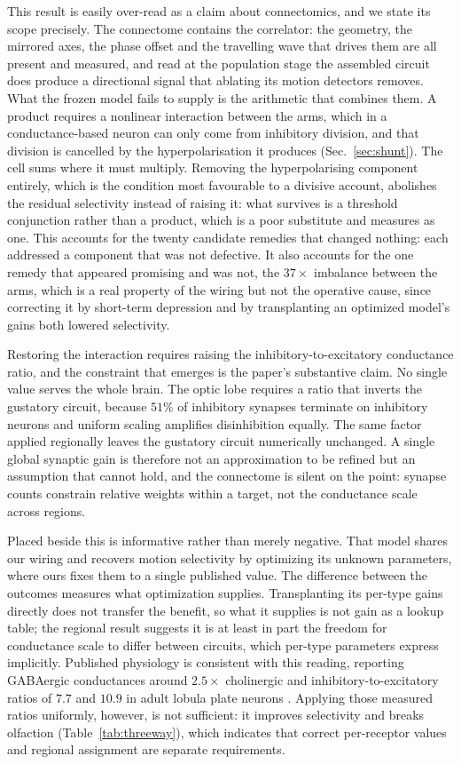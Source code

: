 \documentclass[10pt,twoside]{article}
\begin{document}
This result is easily over-read as a claim about connectomics, and we state its
scope precisely. The connectome contains the correlator: the geometry, the
mirrored axes, the phase offset and the travelling wave that drives them are
all present and measured, and read at the population stage the assembled
circuit does produce a directional signal that ablating its motion detectors
removes. What the frozen model fails to supply is the arithmetic
that combines them. A product requires a nonlinear interaction between the arms,
which in a conductance-based neuron can only come from inhibitory division, and
that division is cancelled by the hyperpolarisation it produces
(Sec.~\ref{sec:shunt}). The cell sums where it must multiply. Removing the
hyperpolarising component entirely, which is the condition most favourable to
a divisive account, abolishes the residual selectivity instead of raising it:
what survives is a threshold conjunction rather than a product, which is a
poor substitute and measures as one. This accounts for
the twenty candidate remedies that changed nothing: each addressed a component
that was not defective. It also accounts for the one remedy that appeared
promising and was not, the $37\times$ imbalance between the arms, which is a
real property of the wiring but not the operative cause, since correcting it by
short-term depression and by transplanting an optimized model's gains both
lowered selectivity.

Restoring the interaction requires raising the inhibitory-to-excitatory
conductance ratio, and the constraint that emerges is the paper's substantive
claim. No single value serves the whole brain. The optic lobe requires a ratio
that inverts the gustatory circuit, because $51\%$ of inhibitory synapses
terminate on inhibitory neurons and uniform scaling amplifies disinhibition
equally. The same factor applied regionally leaves the gustatory circuit
numerically unchanged. A single global synaptic gain is therefore not an
approximation to be refined but an assumption that cannot hold, and the
connectome is silent on the point: synapse counts constrain relative weights
within a target, not the conductance scale across regions.

Placed beside \citet{lappalainen2024} this is informative rather than merely
negative. That model shares our wiring and recovers motion selectivity by
optimizing its unknown parameters, where ours fixes them to a single published
value. The difference between the outcomes measures what optimization supplies.
Transplanting its per-type gains directly does not transfer the benefit, so
what it supplies is not gain as a lookup table; the regional result suggests it
is at least in part the freedom for conductance scale to differ between
circuits, which per-type parameters express implicitly. Published physiology is
consistent with this reading, reporting GABAergic conductances around
$2.5\times$ cholinergic and inhibitory-to-excitatory ratios of $7.7$ and $10.9$
in adult lobula plate neurons \citep{suodowd2003,groschner2022}. Applying those
measured ratios uniformly, however, is not sufficient: it improves selectivity
and breaks olfaction (Table~\ref{tab:threeway}), which indicates that correct
per-receptor values and regional assignment are separate requirements.
\end{document}
